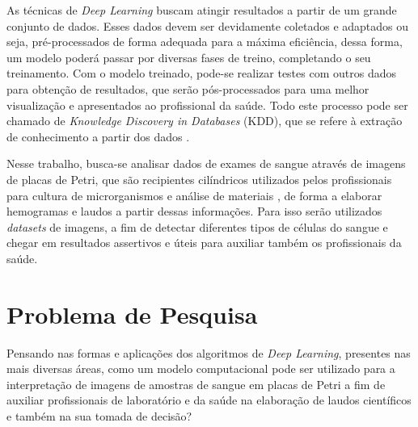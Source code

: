 As técnicas de \emph{Deep Learning} buscam atingir resultados a partir de um grande conjunto de dados. Esses dados devem ser devidamente coletados e adaptados ou seja, pré-processados de forma adequada para a máxima eficiência, dessa forma, um modelo poderá passar por diversas fases de treino, completando o seu treinamento. Com o modelo treinado, pode-se realizar testes com outros dados para obtenção de resultados, que serão pós-processados para uma melhor visualização e apresentados ao profissional da saúde. Todo este processo pode ser chamado de \emph{Knowledge Discovery in Databases} (KDD), que se refere à extração de conhecimento a partir dos dados \cite{kdd} \cite{kdd2}.

Nesse trabalho, busca-se analisar dados de exames de sangue através de imagens de placas de Petri, que são recipientes cilíndricos utilizados pelos profissionais para cultura de microrganismos e análise de materiais \cite{petri}, de forma a elaborar hemogramas e laudos a partir dessas informações. Para isso serão utilizados \emph{datasets} de imagens, a fim de detectar diferentes tipos de células do sangue e chegar em resultados assertivos e úteis para auxiliar também os profissionais da saúde.


\section{Problema de Pesquisa}
\label{sec:problema}

Pensando nas formas e aplicações dos algoritmos de \emph{Deep Learning}, presentes nas mais diversas áreas, como um modelo computacional pode ser utilizado para a interpretação de imagens de amostras de sangue em placas de Petri a fim de auxiliar profissionais de laboratório e da saúde na elaboração de laudos científicos e também na sua tomada de decisão?


